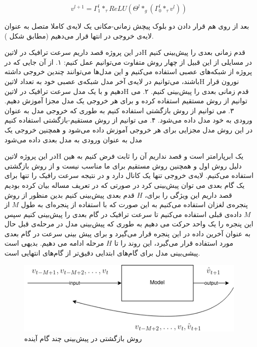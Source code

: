 \begin{equation}
v^{{l+1}} = \Gamma^{l}_{1} *_{\tau} ReLU( \Theta^{l} *_{g} (\Gamma_{0}^{l} *_{\tau} v^{l}) )
  \label{eq:blocks}
\end{equation}

بعد از روی هم قرار دادن دو بلوک پیچش زمانی-مکانی یک لایه‌ی کاملا متصل به عنوان لایه‌ی خروجی در انتها قرار می‌دهیم (مطابق شکل ).

در این پروژه قصد داریم سرعت ترافیک در ‌لاتین{H} قدم زمانی بعدی را پیش‌بینی کنیم در مسایلی از این قبیل از چهار روش متفاوت می‌توانیم عمل کنیم:
۱. از آن جایی که در پروژه از شبکه‌های عصبی استفاده می‌کنیم و این مدل‌ها می‌توانند چندین خروجی داشته باشند، می‌توانیم در لایه‌ی آخر مدل شبکه‌ی عصبی خود به تعداد ‌لاتین{H} نورون قرار دهیم و با یک مدل سرعت ترافیک در ‌لاتین{H} قدم زمانی بعدی را پیش‌بینی کنیم.
۲. می توانیم از روش مستقیم  استفاده کرده و برای هر خروجی یک مدل مجزا آموزش دهیم.
۳. می توانیم از روش بازگشتی  استفاده کنیم به طوری که خروجی مدل به عنوان ورودی به خود مدل داده می‌شود.
۴. می توانیم از روش مستقیم-بازگشتی  استفاده کنیم در این روش مدل مجزایی برای هر خروجی آموزش داده می‌شود و همچنین خروجی یک مدل به عنوان ورودی به مدل بعدی داده می‌شود

در این پروژه ‌لاتین{‌H} یک ابرپارامتر است و قصد نداریم آن را ثابت فرض کنیم به هین دلیل روش اول و همچنین روش مستقیم برای ما مناسب نیست و از روش بازگشتی استفاده می‌کنیم. لایه‌ی خروجی تنها یک کانال دارد و در نتیجه سرعت رافیک را تنها برای یک گام بعدی می توان پیش‌بینی کرد در صورتی که در تعریف مساله بیان کرده بودیم قصد داریم این ویژگی را برای،
$H$
قدم بعدی پیش‌بینی کنیم بدین منظور از روش پنجره‌ی لغزان
استفاده می‌کنیم به این صورت که با استفاده از پنجره‌ای به طول
$M$
از
$M$
داده‌ی قبلی استفاده می‌کنیم تا سرعت ترافیک در گام بعدی را پیش‌بینی کنیم سپس این پنجره را یک واحد حرکت می دهیم به طوری که پیش‌بینی مدل در مرحله‌ی قبل حال به عنوان آخرین داده در این پنجره قرار می‌گیرد و برای پیش ‌بینی سرعت در گام بعدی مورد استفاده قرار می‌گیرد، این روند را تا
$H$
مرحله ادامه می دهیم. بدیهی است پیشی‌بینی مدل برای گام‌های ابتدایی دقیق‌تر از گام‌های انتهایی است.


\begin{figure}
  \includegraphics[width=\textwidth]{./images/recursive.png}
  \centering
  \caption{
روش بازگشتی در پیش‌بینی چند گام آینده }
  \label{fig:blocks}
\end{figure}


